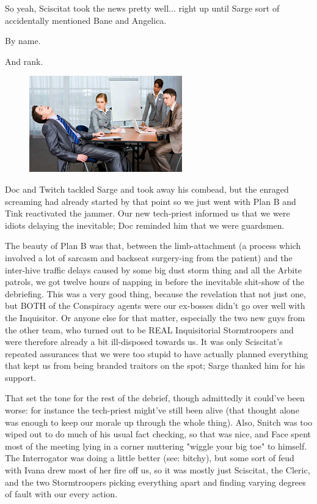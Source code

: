 So yeah, Sciscitat took the news pretty well... 
right up until Sarge sort of accidentally mentioned Bane and Angelica.

By name.

And rank.

\begin{figure}
	\begin{center}
		\includegraphics[width=\figwidth]{pics/19/10.png}
	\end{center}
\end{figure}
Doc and Twitch tackled Sarge and took away his combead, but the enraged screaming had already started by that point so we just went with Plan B and Tink reactivated the jammer. 
Our new tech-priest informed us that we were idiots delaying the inevitable; 
Doc reminded him that we were guardsmen.

The beauty of Plan B was that, between the limb-attachment (a process which involved a lot of sarcasm and backseat surgery-ing from the patient) and the inter-hive traffic delays caused by some big dust storm thing and all the Arbite patrols, we got twelve hours of napping in before the inevitable shit-show of the debriefing. 
This was a very good thing, because the revelation that not just one, but BOTH of the Conspiracy agents were our ex-bosses didn't go over well with the Inquisitor. 
Or anyone else for that matter, especially the two new guys from the other team, who turned out to be REAL Inquisitorial Stormtroopers and were therefore already a bit ill-disposed towards us. 
It was only Sciscitat's repeated assurances that we were too stupid to have actually planned everything that kept us from being branded traitors on the spot; 
Sarge thanked him for his support. 


That set the tone for the rest of the debrief, though admittedly it could've been worse: 
for instance the tech-priest might've still been alive (that thought alone was enough to keep our morale up through the whole thing). 
Also, Snitch was too wiped out to do much of his usual fact checking, so that was nice, and Face spent most of the meeting lying in a corner muttering "wiggle your big toe" to himself. 
The Interrogator was doing a little better (see: 
bitchy), but some sort of feud with Ivana drew most of her fire off us, so it was mostly just Sciscitat, the Cleric, and the two Stormtroopers picking everything apart and finding varying degrees of fault with our every action.

